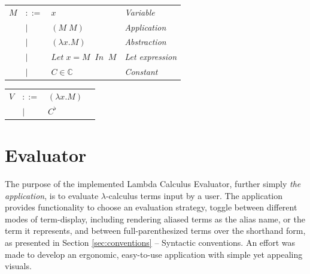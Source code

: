 \documentclass[table, a4paper, 10pt]{article}
\begin{document}
\vspace{3mm}
\begin{tabular}{llll}
$M$ &$::=$             &$x$                 & {\small\hspace{0.2cm}\textit{Variable}}\\
    &\hspace{0.1cm}$|$ &$(M\;M)$            & {\small\hspace{0.2cm}\textit{Application}}\\
    &\hspace{0.1cm}$|$ &$(\lambda x.M)$     & {\small\hspace{0.2cm}\textit{Abstraction}}\\
    &\hspace{0.1cm}$|$ &$\mathit{Let}\;x = M\;\;\mathit{In}\;\;M$  & {\small\hspace{0.2cm}\textit{Let expression}}\\
    &\hspace{0.1cm}$|$ &$C \in \mathbb{C}$  & {\small\hspace{0.2cm}\textit{Constant}}\\
\end{tabular}
\begin{tabular}{llll}
\hspace{11mm}$V$ &$::=$             &$(\lambda x.M)$     &\\
\hspace{11mm}    &\hspace{0.1cm}$|$ &$C^\flat$  &
\hspace{11mm}	\vspace{8.4mm}
\end{tabular}
\vspace{3mm}

\newpage
\section{Evaluator}
The purpose of the implemented Lambda Calculus Evaluator,
further simply \textit{the application}, is to evaluate $\lambda$-calculus
terms input by a user.
The application provides functionality to
choose an evaluation strategy, toggle between different modes
of term-display, including rendering aliased terms as the alias name,
or the term it represents, and between full-parenthesized terms over
the shorthand form, as presented in Section \ref{sec:conventions} -- Syntactic conventions.
An effort was made to develop an ergonomic, easy-to-use application with 
simple yet appealing visuals.
\end{document}
